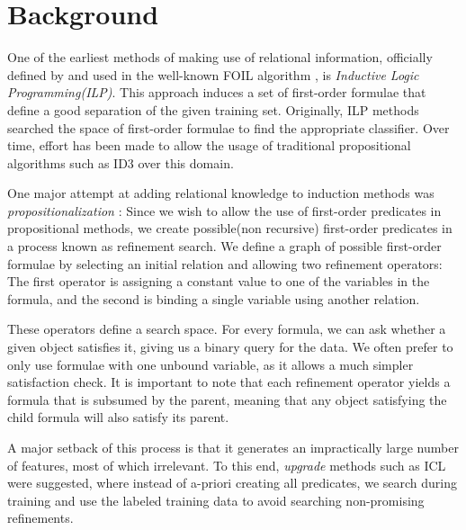 \documentclass[12pt, a4paper]{article}
\theoremstyle{definition}
\begin{document}
\section{Background} \label{background}

One of the earliest methods of making use of relational information, officially defined by \citet{muggleton1991inductive} and used in the well-known FOIL algorithm \citep{quinlan1990learning}, is \emph{Inductive Logic Programming(ILP)}. This approach induces a set of first-order formulae
that define a good separation of the given training set. Originally, ILP methods searched the space of first-order formulae to find the appropriate classifier.
Over time, effort has been made to allow the usage of traditional propositional algorithms such as ID3 \citep{quinlan1986} over this domain.

One major attempt at adding relational knowledge to induction methods was \emph{propositionalization} \citep{kramer2000bottom}: Since we wish to allow the use of first-order predicates in propositional methods, we create possible(non recursive) first-order predicates in a process known as refinement search.
We define a graph of possible first-order formulae by selecting an initial relation and allowing two refinement operators: The first operator is assigning a constant value to one of the variables in the formula, and the second is binding a single variable using another relation.

These operators define a search space. For every formula, we can ask whether a given object satisfies it, giving us a binary query for the data. We often prefer to only use formulae with one unbound variable, as it allows a much simpler satisfaction check.
It is important to note that each refinement operator yields a formula that is subsumed by the parent, meaning that any object satisfying the child formula will also satisfy its parent.

A major setback of this process is that it generates an impractically large number of features, most of which irrelevant.  To this end, \emph{upgrade} methods such as ICL \citep{van2001upgrade} were suggested, where instead of a-priori creating all predicates, we search during training and use the labeled training data to avoid searching non-promising refinements. %
\end{document}
